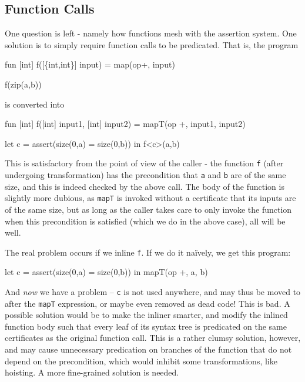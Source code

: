 \subsection{Function Calls}

One question is left - namely how functions mesh with the assertion
system.  One solution is to simply require function calls to be
predicated.  That is, the program
\begin{colorcode}
fun [int] f([\{int,int\}] input) =
  map(op+, input)

f(zip(a,b))
\end{colorcode}
is converted into
\begin{colorcode}
fun [int] f([int] input1, [int] input2) =
  mapT(op +, input1, input2)

let c = assert(size(0,a) = size(0,b)) in
f<c>(a,b)
\end{colorcode}

This is satisfactory from the point of view of the caller - the
function \texttt{f} (after undergoing transformation) has the
precondition that \texttt{a} and \texttt{b} are of the same size, and
this is indeed checked by the above call.  The body of the function is
slightly more dubious, as \texttt{mapT} is invoked without a
certificate that its inputs are of the same size, but as long as the
caller takes care to only invoke the function when this precondition
is satisfied (which we do in the above case), all will be well.

The real problem occurs if we inline \texttt{f}.  If we do it naïvely,
we get this program:
\begin{colorcode}
let c = assert(size(0,a) = size(0,b)) in
mapT(op +, a, b)
\end{colorcode}
And \textit{now} we have a problem -- \texttt{c} is not used anywhere,
and may thus be moved to after the \texttt{mapT} expression, or maybe
even removed as dead code!  This is bad.  A possible solution would be
to make the inliner smarter, and modify the inlined function body such
that every leaf of its syntax tree is predicated on the same
certificates as the original function call.  This is a rather clumsy
solution, however, and may cause unnecessary predication on branches
of the function that do not depend on the precondition, which would
inhibit some transformations, like hoisting.  A more fine-grained
solution is needed.


